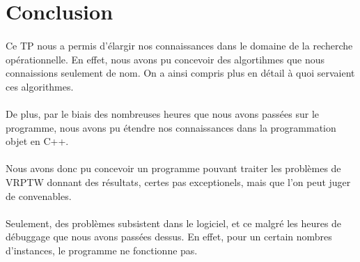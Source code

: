 \documentclass[12pt]{article}
\begin{document}
\clearpage
\section{Conclusion}

\paragraph{}
Ce TP nous a permis d'élargir nos connaissances dans le domaine de la recherche opérationnelle. En effet, nous avons pu concevoir des algortihmes que nous 
connaissions seulement de nom. On a ainsi compris plus en détail à quoi servaient ces algorithmes.

\paragraph{}
De plus, par le biais des nombreuses heures que nous avons passées sur le programme, nous avons pu étendre nos connaissances dans la programmation objet en C++.

\paragraph{}
Nous avons donc pu concevoir un programme pouvant traiter les problèmes de VRPTW donnant des résultats, certes pas exceptionels, mais que l'on peut juger de convenables.

\paragraph{}
Seulement, des problèmes subsistent dans le logiciel, et ce malgré les heures de débuggage que nous avons passées dessus. En effet, pour un 
certain nombres d'instances, le programme ne fonctionne pas. 
\end{document}
